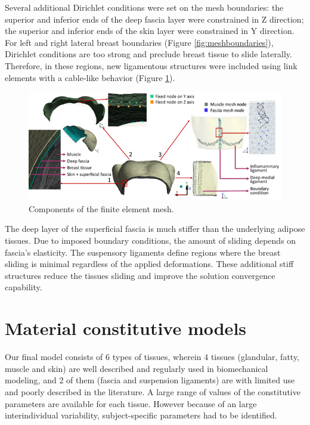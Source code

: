 Several additional Dirichlet conditions were set on the mesh boundaries: the superior and inferior ends of the deep fascia layer were constrained in Z direction; the superior and inferior ends of the skin layer were constrained in Y direction. For left and right lateral breast boundaries (Figure \ref{fig:meshboundaries}), Dirichlet conditions are too strong and preclude breast tissue to slide laterally. Therefore, in these regions, new ligamentous structures were included using link elements with a cable-like behavior (Figure \ref{fig:mesh_components_BC}).



\begin{figure}[!h]
\centering
\includegraphics[width=1\textwidth,keepaspectratio]{figures/mesh_components.png} 
\caption{Components of the finite element mesh.}\label{fig:mesh_components_BC}
\end{figure}

 The deep layer of the superficial fascia is much stiffer than the underlying adipose tissues. Due to imposed boundary conditions, the amount of sliding depends on fascia's elasticity. The suspensory ligaments define regions where the breast sliding is minimal regardless of the applied deformations. These additional stiff structures reduce the tissues sliding and improve the solution convergence capability. 

\section{Material constitutive models}
\label{section:myConstitutivModels}

Our final model consists of 6 types of tissues, wherein 4 tissues (glandular, fatty, muscle and skin) are well described and regularly used in biomechanical modeling, and 2 of them (fascia and suspension ligaments) are with limited use and poorly described in the literature. A large range of values of the constitutive parameters are available for each tissue. However because of an large interindividual variability, subject-specific parameters had to be identified.  



